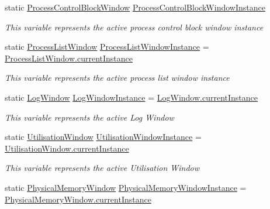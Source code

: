 \begin{DoxyCompactItemize}
static \hyperlink{class_c_p_u___o_s___simulator_1_1_process_control_block_window}{Process\+Control\+Block\+Window} \hyperlink{class_c_p_u___o_s___simulator_1_1_window_bridge_1_1_window_instances_a7c6ba1b614cf567f4a34d455cd98b8e0}{Process\+Control\+Block\+Window\+Instance}
\begin{DoxyCompactList}\small\item\em This variable represents the active process control block window instance \end{DoxyCompactList}\item 
static \hyperlink{class_c_p_u___o_s___simulator_1_1_process_list_window}{Process\+List\+Window} \hyperlink{class_c_p_u___o_s___simulator_1_1_window_bridge_1_1_window_instances_a1e4da15e51ef4f7cd4f4862e411630e9}{Process\+List\+Window\+Instance} = \hyperlink{class_c_p_u___o_s___simulator_1_1_process_list_window_a102d7796240201b548db10f1d129d9d0}{Process\+List\+Window.\+current\+Instance}
\begin{DoxyCompactList}\small\item\em This variable represents the active process list window instance \end{DoxyCompactList}\item 
static \hyperlink{class_c_p_u___o_s___simulator_1_1_log_window}{Log\+Window} \hyperlink{class_c_p_u___o_s___simulator_1_1_window_bridge_1_1_window_instances_a84aad7db7b60a824217002ac7435f5dc}{Log\+Window\+Instance} = \hyperlink{class_c_p_u___o_s___simulator_1_1_log_window_ae888c936335930faf46e6a121b0a34ac}{Log\+Window.\+current\+Instance}
\begin{DoxyCompactList}\small\item\em This variable represents the active Log Window \end{DoxyCompactList}\item 
static \hyperlink{class_c_p_u___o_s___simulator_1_1_utilisation_window}{Utilisation\+Window} \hyperlink{class_c_p_u___o_s___simulator_1_1_window_bridge_1_1_window_instances_a011cba976727ec53f3667730d137168d}{Utilisation\+Window\+Instance} = \hyperlink{class_c_p_u___o_s___simulator_1_1_utilisation_window_a4f5f9f6ec438e3c166d4c7a3fa29e131}{Utilisation\+Window.\+current\+Instance}
\begin{DoxyCompactList}\small\item\em This variable represents the active Utilisation Window \end{DoxyCompactList}\item 
static \hyperlink{class_c_p_u___o_s___simulator_1_1_physical_memory_window}{Physical\+Memory\+Window} \hyperlink{class_c_p_u___o_s___simulator_1_1_window_bridge_1_1_window_instances_a267a28b98fc5ab6438873d3ba52d686c}{Physical\+Memory\+Window\+Instance} = \hyperlink{class_c_p_u___o_s___simulator_1_1_physical_memory_window_a5baebf9b07c700f57ea5e6c6ec96e7c5}{Physical\+Memory\+Window.\+current\+Instance}

\end{DoxyCompactItemize}
